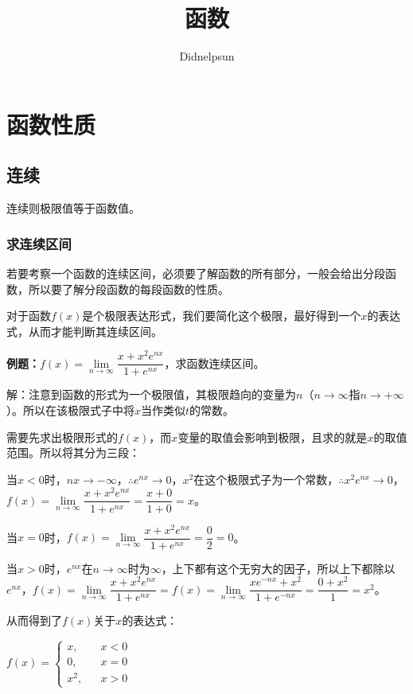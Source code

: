 \documentclass[UTF8, 12pt]{ctexart}
\author{Didnelpsun}
\title{函数}
\date{}
\begin{document}
\maketitle
\pagestyle{empty}
\thispagestyle{empty}
\tableofcontents
\thispagestyle{empty}
\newpage
\pagestyle{plain}
\setcounter{page}{1}
\section{函数性质}

\subsection{连续}

连续则极限值等于函数值。

\subsubsection{求连续区间}

若要考察一个函数的连续区间，必须要了解函数的所有部分，一般会给出分段函数，所以要了解分段函数的每段函数的性质。

对于函数$f(x)$是个极限表达形式，我们要简化这个极限，最好得到一个$x$的表达式，从而才能判断其连续区间。\medskip

\textbf{例题：}$f(x)=\lim\limits_{n\to\infty}\dfrac{x+x^2e^{nx}}{1+e^{nx}}$，求函数连续区间。\medskip

解：注意到函数的形式为一个极限值，其极限趋向的变量为$n$（$n\to\infty$指$n\to+\infty$）。所以在该极限式子中将$x$当作类似$t$的常数。

需要先求出极限形式的$f(x)$，而$x$变量的取值会影响到极限，且求的就是$x$的取值范围。所以将其分为三段：

当$x<0$时，$nx\to-\infty$，$\therefore e^{nx}\to 0$，$x^2$在这个极限式子为一个常数，$\therefore x^2e^{nx}\to 0$，$f(x)=\lim\limits_{n\to\infty}\dfrac{x+x^2e^{nx}}{1+e^{nx}}=\dfrac{x+0}{1+0}=x$。\medskip

当$x=0$时，$f(x)=\lim\limits_{n\to\infty}\dfrac{x+x^2e^{nx}}{1+e^{nx}}=\dfrac{0}{2}=0$。\medskip

当$x>0$时，$e^{nx}$在$n\to\infty$时为$\infty$，上下都有这个无穷大的因子，所以上下都除以$e^{nx}$，$f(x)=\lim\limits_{n\to\infty}\dfrac{x+x^2e^{nx}}{1+e^{nx}}=f(x)=\lim\limits_{n\to\infty}\dfrac{xe^{-nx}+x^2}{1+e^{-nx}}=\dfrac{0+x^2}{1}=x^2$。\medskip

从而得到了$f(x)$关于$x$的表达式：\medskip

$f(x)=\left\{\begin{array}{lcl}
        x,   &  & x<0 \\
        0,   &  & x=0 \\
        x^2, &  & x>0
    \end{array}
    \right.$\medskip
\end{document}

